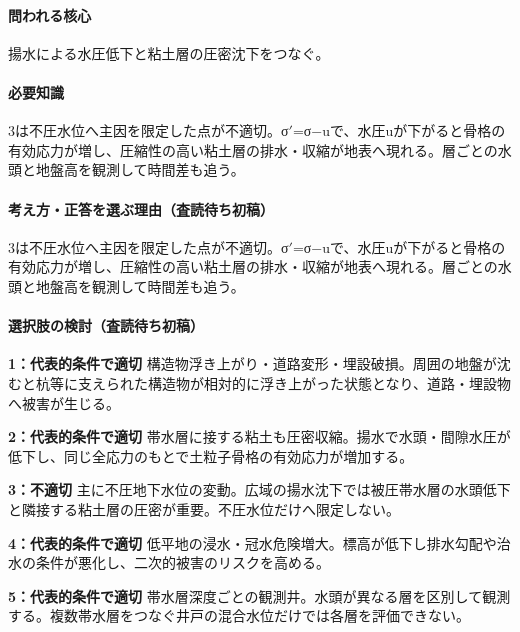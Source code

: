 \paragraph{問われる核心} 揚水による水圧低下と粘土層の圧密沈下をつなぐ。

\paragraph{必要知識} 3は不圧水位へ主因を限定した点が不適切。σ\ensuremath{'}=σ−uで、水圧uが下がると骨格の有効応力が増し、圧縮性の高い粘土層の排水・収縮が地表へ現れる。層ごとの水頭と地盤高を観測して時間差も追う。

\paragraph{考え方・正答を選ぶ理由（査読待ち初稿）} 3は不圧水位へ主因を限定した点が不適切。σ\ensuremath{'}=σ−uで、水圧uが下がると骨格の有効応力が増し、圧縮性の高い粘土層の排水・収縮が地表へ現れる。層ごとの水頭と地盤高を観測して時間差も追う。

\paragraph{選択肢の検討（査読待ち初稿）}\mbox{}\par

\noindent\textbf{1：代表的条件で適切} 構造物浮き上がり・道路変形・埋設破損。周囲の地盤が沈むと杭等に支えられた構造物が相対的に浮き上がった状態となり、道路・埋設物へ被害が生じる。\par

\noindent\textbf{2：代表的条件で適切} 帯水層に接する粘土も圧密収縮。揚水で水頭・間隙水圧が低下し、同じ全応力のもとで土粒子骨格の有効応力が増加する。\par

\noindent\textbf{3：不適切} 主に不圧地下水位の変動。広域の揚水沈下では被圧帯水層の水頭低下と隣接する粘土層の圧密が重要。不圧水位だけへ限定しない。\par

\noindent\textbf{4：代表的条件で適切} 低平地の浸水・冠水危険増大。標高が低下し排水勾配や治水の条件が悪化し、二次的被害のリスクを高める。\par

\noindent\textbf{5：代表的条件で適切} 帯水層深度ごとの観測井。水頭が異なる層を区別して観測する。複数帯水層をつなぐ井戸の混合水位だけでは各層を評価できない。\par

